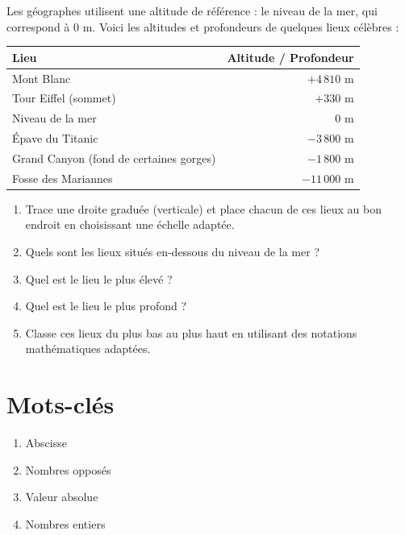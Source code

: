 \documentclass[../../syllabus_1.tex]{subfiles}
\begin{document}
\begin{exercise}
    Les géographes utilisent une altitude de référence : le niveau de la mer, qui correspond à \(0\) m. Voici les altitudes et profondeurs de quelques lieux célèbres :
    \begin{center}
        \begin{tabular}{|l|r|}
            \hline
            \textbf{Lieu} & \textbf{Altitude / Profondeur} \\
            \hline
                Mont Blanc                                 & $+4\,810$ m  \\
                Tour Eiffel (sommet)                       & $+330$ m     \\
                Niveau de la mer                           & $0$ m        \\
                Épave du Titanic                           & $-3\,800$ m  \\
                Grand Canyon (fond de certaines gorges)    & $-1\,800$ m  \\                    Fosse des Mariannes                        & $-11\,000$ m \\
            \hline
        \end{tabular}
    \end{center}
    \begin{enumerate}
        \item Trace une droite graduée (verticale) et place chacun de ces lieux au bon endroit en choisissant une échelle adaptée. 
        \item Quels sont les lieux situés en-dessous du niveau de la mer ? 
        \item Quel est le lieu le plus élevé ? 
        \item Quel est le lieu le plus profond ?
        \item Classe ces lieux du plus bas au plus haut en utilisant des notations mathématiques adaptées.  
    \end{enumerate}
\end{exercise}

\newpage
\section*{Mots-clés}
\begin{enumerate}[cols=2, label=\textbf{\arabic*.}]
    \item Abscisse
    \item Nombres opposés
    \item Valeur absolue
    \item Nombres entiers
\end{enumerate}
\end{document}
